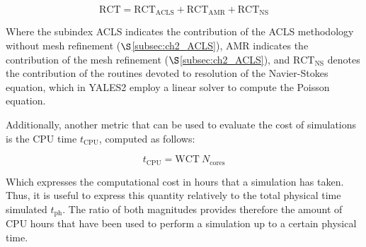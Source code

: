 \begin{equation}
\label{eq:RCT_contributions}
\mathrm{RCT} = \mathrm{RCT}_\mathrm{ACLS} + \mathrm{RCT}_\mathrm{AMR} + \mathrm{RCT}_\mathrm{NS}
\end{equation}

Where the subindex ACLS indicates the contribution of the ACLS methodology without mesh refinement ($\S$\ref{subsec:ch2_ACLS}), AMR indicates the contribution of the mesh refinement ($\S$\ref{subsec:ch2_ACLS}), and $\mathrm{RCT}_\mathrm{NS}$ denotes the contribution of the routines devoted to resolution of the Navier-Stokes equation, which in YALES2 employ a linear solver to compute the Poisson equation.

Additionally, another metric that can be used to evaluate the cost of simulations is the CPU time $t_\mathrm{CPU}$, computed as follows:

\begin{equation}
\label{eq:t_CPU_definition}
t_\mathrm{CPU} = \mathrm{WCT} ~ N_\mathrm{cores}
\end{equation}

Which expresses the computational cost in hours that a simulation has taken. Thus, it is useful to express this quantity relatively to the total physical time simulated $t_\mathrm{ph}$. The ratio of both magnitudes provides therefore the amount of CPU hours that have been used to perform a simulation up to a certain physical time.

